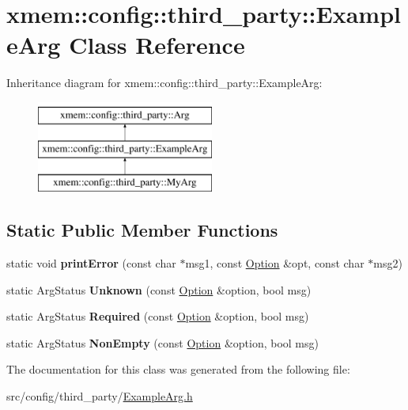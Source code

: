 \hypertarget{classxmem_1_1config_1_1third__party_1_1_example_arg}{}\section{xmem\+:\+:config\+:\+:third\+\_\+party\+:\+:Example\+Arg Class Reference}
\label{classxmem_1_1config_1_1third__party_1_1_example_arg}
Inheritance diagram for xmem\+:\+:config\+:\+:third\+\_\+party\+:\+:Example\+Arg\+:\begin{figure}[H]
\begin{center}
\leavevmode
\includegraphics[height=3.000000cm]{classxmem_1_1config_1_1third__party_1_1_example_arg}
\end{center}
\end{figure}
\subsection*{Static Public Member Functions}
\begin{DoxyCompactItemize}
\item 
\hypertarget{classxmem_1_1config_1_1third__party_1_1_example_arg_a6121fd77d3727bb02ccd4438256beda0}{}static void {\bfseries print\+Error} (const char $\ast$msg1, const \hyperlink{classxmem_1_1config_1_1third__party_1_1_option}{Option} \&opt, const char $\ast$msg2)\label{classxmem_1_1config_1_1third__party_1_1_example_arg_a6121fd77d3727bb02ccd4438256beda0}

\item 
\hypertarget{classxmem_1_1config_1_1third__party_1_1_example_arg_a62f8121cadd8dfee722a1649caaa878c}{}static Arg\+Status {\bfseries Unknown} (const \hyperlink{classxmem_1_1config_1_1third__party_1_1_option}{Option} \&option, bool msg)\label{classxmem_1_1config_1_1third__party_1_1_example_arg_a62f8121cadd8dfee722a1649caaa878c}

\item 
\hypertarget{classxmem_1_1config_1_1third__party_1_1_example_arg_a9c71f36051376cdfbb807049a92921cf}{}static Arg\+Status {\bfseries Required} (const \hyperlink{classxmem_1_1config_1_1third__party_1_1_option}{Option} \&option, bool msg)\label{classxmem_1_1config_1_1third__party_1_1_example_arg_a9c71f36051376cdfbb807049a92921cf}

\item 
\hypertarget{classxmem_1_1config_1_1third__party_1_1_example_arg_ae641da2aeb27824f7a26b6859ba75dd3}{}static Arg\+Status {\bfseries Non\+Empty} (const \hyperlink{classxmem_1_1config_1_1third__party_1_1_option}{Option} \&option, bool msg)\label{classxmem_1_1config_1_1third__party_1_1_example_arg_ae641da2aeb27824f7a26b6859ba75dd3}

\end{DoxyCompactItemize}


The documentation for this class was generated from the following file\+:\begin{DoxyCompactItemize}
\item 
src/config/third\+\_\+party/\hyperlink{_example_arg_8h}{Example\+Arg.\+h}\end{DoxyCompactItemize}
